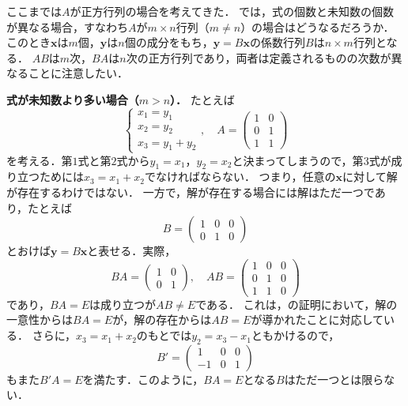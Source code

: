 \begin{remark}[係数行列が正方行列でない場合]
  ここまでは$A$が正方行列の場合を考えてきた．
  では，式の個数と未知数の個数が異なる場合，すなわち$A$が$m \times n$行列（$m \ne n$）の場合はどうなるだろうか．
  このとき$\bm{x}$は$m$個，$\bm{y}$は$n$個の成分をもち，$\bm{y} = B\bm{x}$の係数行列$B$は$n \times m$行列となる．
  $AB$は$m$次，$BA$は$n$次の正方行列であり，両者は定義されるものの次数が異なることに注意したい．

  \textbf{式が未知数より多い場合（$m > n$）．}
  たとえば
  \[
    \begin{cases}
      x_1 = y_1 \\
      x_2 = y_2 \\
      x_3 = y_1 + y_2
    \end{cases}, \quad
    A = \begin{pmatrix} 1 & 0 \\ 0 & 1 \\ 1 & 1 \end{pmatrix}
  \]
  を考える．第$1$式と第$2$式から$y_1 = x_1$，$y_2 = x_2$と決まってしまうので，第$3$式が成り立つためには$x_3 = x_1 + x_2$でなければならない．
  つまり，任意の$\bm{x}$に対して解が存在するわけではない．
  一方で，解が存在する場合には解はただ一つであり，たとえば
  \[
    B = \begin{pmatrix} 1 & 0 & 0 \\ 0 & 1 & 0 \end{pmatrix}
  \]
  とおけば$\bm{y} = B\bm{x}$と表せる．実際，
  \[
    BA = \begin{pmatrix} 1 & 0 \\ 0 & 1 \end{pmatrix}, \quad
    AB = \begin{pmatrix} 1 & 0 & 0 \\ 0 & 1 & 0 \\ 1 & 1 & 0 \end{pmatrix}
  \]
  であり，$BA = E$は成り立つが$AB \ne E$である．
  これは，の証明において，解の一意性からは$BA = E$が，解の存在からは$AB = E$が導かれたことに対応している．
  さらに，$x_3 = x_1 + x_2$のもとでは$y_2 = x_3 - x_1$ともかけるので，
  \[
    B' = \begin{pmatrix} 1 & 0 & 0 \\ -1 & 0 & 1 \end{pmatrix}
  \]
  もまた$B'A = E$を満たす．このように，$BA = E$となる$B$はただ一つとは限らない．


\end{remark}
